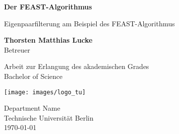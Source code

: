 \begin{titlepage}
  \begin{center}
    \vspace*{1cm}

    \Huge
    \textbf{Der FEAST-Algorithmus}

    \vspace{0.5cm}
    \LARGE
    Eigenpaarfilterung am Beispiel des FEAST-Algorithmus

    \vspace{1.5cm}

    \textbf{Thorsten Matthias Lucke}\\
    Betreuer

    \vfill

    Arbeit zur Erlangung des akademischen Grades\\
    Bachelor of Science

    \vspace{0.8cm}

    \texttt{[image: images/logo\_tu]}

    \Large
    Department Name\\
    Technische Universität Berlin\\
    \today

  \end{center}
\end{titlepage}
